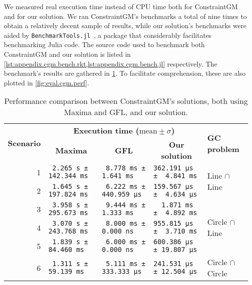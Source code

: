 We measured real execution time instead of \ac{CPU} time both for ConstraintGM
and for our solution.  We ran ConstraintGM's benchmarks a total of nine times to
obtain a relatively decent sample of results, while our solution's benchmarks
were aided by \texttt{BenchmarkTools.jl}~\cite{Chen:2016:BenchmarkTools.jl}, a
package that considerably facilitates benchmarking Julia code.  The source code
used to benchmark both ConstraintGM and our solution is listed in
\cref{lst:appendix.cgm.bench.rkt,lst:appendix.cgm.bench.jl} respectively.  The
benchmark's results are gathered in \cref{tab:eval.cgm.perf}.  To facilitate
comprehension, these are also plotted in \cref{fig:eval.cgm.perf}.

\begin{table}[htb]
  \caption[ConstraintGM performance benchmarks]{\label{tab:eval.cgm.perf}%
    Performance comparison between ConstraintGM's solutions, both using Maxima
    and \ac{GFL}, and our solution.}
  \footnotesize\centering
  \begin{tabular*}{\linewidth}{r*{3}{l}l}
    \toprule
    \multirow{2}{*}{\textbf{Scenario}}
    & \multicolumn{3}{c}{\textbf{Execution time ($\mathrm{mean}\pm\sigma$)}}
    & \multirow{2}{*}{\textbf{GC problem}} \\
    & \multicolumn{1}{c}{\textbf{Maxima}}
    & \multicolumn{1}{c}{\textbf{GFL}}
    & \multicolumn{1}{c}{\textbf{Our solution}} & \\
    \midrule
     1 & \verb| 2.265 s ± 142.344 ms|
       & \verb| 8.778 ms ±   1.641 ms|
       & \verb|362.191 μs ±  4.841 ms|
       & \multirow{2}{*}{Line $\cap$ Line}\\
     2 & \verb| 1.645 s ± 197.824 ms|
       & \verb| 6.222 ms ± 440.959 μs|
       & \verb|159.567 μs ±  4.634 μs| &\\
    \midrule
     3 & \verb| 3.958 s ± 295.673 ms|
       & \verb| 9.444 ms ±   1.333 ms|
       & \verb|  1.871 ms ±  4.892 ms| 
       & \multirow{3}{*}{Circle $\cap$ Line}\\
     4 & \verb| 3.070 s ± 243.768 ms|
       & \verb| 8.000 ms ±   0.000 ns|
       & \verb|955.815 μs ±  3.710 ms| &\\
     5 & \verb| 1.839 s ±  84.460 ms|
       & \verb| 6.000 ms ±   0.000 ns|
       & \verb|600.386 μs ± 19.807 μs| &\\
    \midrule
     6 & \verb| 1.311 s ±  59.139 ms|
       & \verb| 5.111 ms ± 333.333 μs|
       & \verb|241.531 μs ± 12.504 μs| 
       & \multirow{8}{*}{Circle $\cap$ Circle}\\

\end{tabular*}
\end{table}
